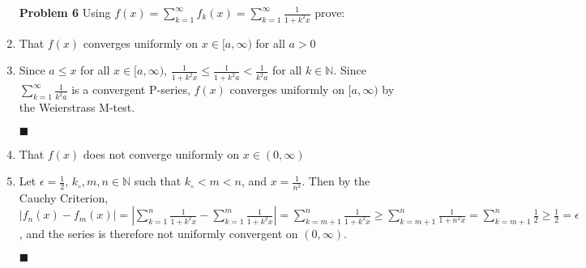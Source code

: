 \documentclass[a4paper,12pt]{report}
\newcommand{\bb}[1]{\mathbb{#1}}
\newcommand{\naught}[1]{{#1}_{\circ}}
\newcommand{\problem}[3]{
	\begin{enumerate}
		\item[\bf{Problem #1}] #2 
		#3
	\end{enumerate}
}
\newcommand{\subproof}[3]{
	\item[#1] #2
	\item[\bf{Proof:}] 
	#3 
	\begin{flushright}
		$\blacksquare$
	\end{flushright}
}
\begin{document}
\pagebreak

\problem{6}{
	Using $f(x) = \sum\limits_{k=1}^{\infty}f_{k}(x) = \sum\limits_{k=1}^{\infty}\frac{1}{1 + k^2 x}$ prove:
}{
	\subproof{(a)}{
		That $f(x)$ converges uniformly on $x \in [a,\infty)$ for all $a>0$
	}{
		Since $a \leqslant x$ for all $x \in [a,\infty)$, $\frac{1}{1+k^2 x} \leqslant \frac{1}{1+k^2 a} < \frac{1}{k^2 a}$ for all $k \in \bb{N}$. Since $\sum\limits_{k=1}^{\infty}\frac{1}{k^2 a}$ is a convergent P-series, $f(x)$ converges uniformly on $[a,\infty)$ by the Weierstrass M-test.
	}
	
	\subproof{(b)}{
		That $f(x)$ does not converge uniformly on $x \in (0,\infty)$
	}{
		
		Let $\epsilon = \frac{1}{2}$, $\naught{k},m,n \in \bb{N}$ such that $\naught{k} < m < n$, and $x=\frac{1}{n^2}$. Then by the Cauchy Criterion, $\left|f_n(x) - f_m(x)\right| = \left|\sum\limits_{k=1}^{n}\frac{1}{1 + k^2 x} - \sum\limits_{k=1}^{m}\frac{1}{1 + k^2 x}\right| = \sum\limits_{k=m+1}^{n}\frac{1}{1 + k^2 x} \geqslant \sum\limits_{k=m+1}^{n}\frac{1}{1 + n^2 x} = \sum\limits_{k=m+1}^{n}\frac{1}{2} \geqslant \frac{1}{2} = \epsilon$, and the series is therefore not uniformly convergent on $(0,\infty)$.
	}
}

\pagebreak
\end{document}
